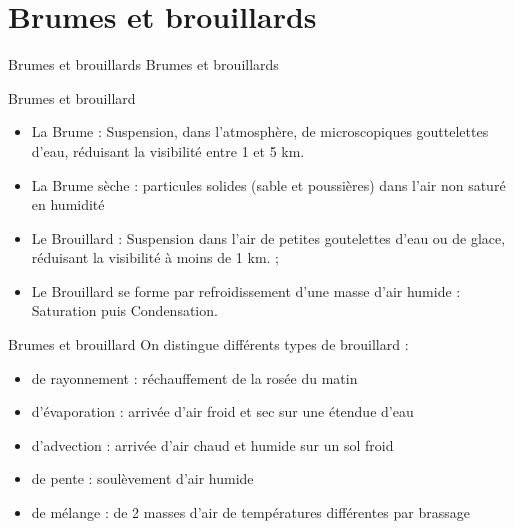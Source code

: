\documentclass{beamer}
\begin{document}
\section{Brumes et brouillards}
\begin{frame}{Brumes et brouillards}
  \LARGE{Brumes et brouillards}
\end{frame}

\begin{frame}{Brumes et brouillard}
  \begin{itemize}
    \item La Brume : Suspension, dans l’atmosphère, de microscopiques gouttelettes d’eau, réduisant la visibilité entre 1 et 5 km. \pause
    \item La Brume sèche : particules solides (sable et poussières) dans l'air non saturé en humidité \pause
    \item Le Brouillard : Suspension dans l'air de petites goutelettes d'eau ou de glace, réduisant la visibilité à moins de 1 km. ; \pause
    \item Le Brouillard se forme par refroidissement d'une masse d'air humide : Saturation puis Condensation.
  \end{itemize}
\end{frame}

\begin{frame}{Brumes et brouillard}
  On distingue différents types de brouillard :
  \pause
  \begin{itemize}
    \item de rayonnement : réchauffement de la rosée du matin \pause
    \item d'évaporation : arrivée d'air froid et sec sur une étendue d'eau \pause
    \item d'advection : arrivée d'air chaud et humide sur un sol froid \pause
    \item de pente : soulèvement d'air humide \pause
    \item de mélange : de 2 masses d'air de températures différentes par brassage
  \end{itemize}
\end{frame}
\end{document}
